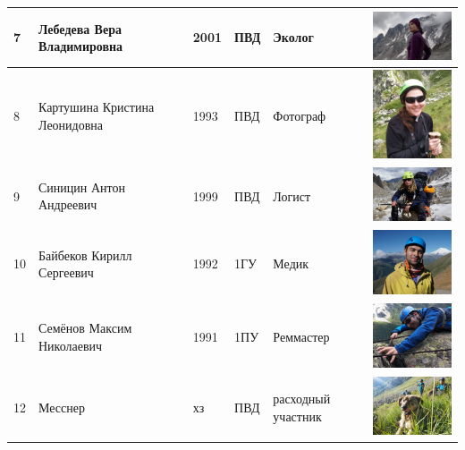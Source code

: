 \documentclass[]{article}
\begin{document}
\begin{center}
\begin{longtable}{|m{0.3cm}|m{3cm}|m{0.7cm}|m{1cm}|m{2cm}|m{4cm}|}
			
			7 &Лебедева Вера Владимировна&2001&ПВД&Эколог&
			\includegraphics[width=4cm]{Vera}\\
			\hline
			8 &Картушина Кристина Леонидовна&1993&ПВД&Фотограф&
			\includegraphics[width=4cm]{Kris}\\
			\hline
			9 &Синицин Антон Андреевич&1999&ПВД&Логист&
			\includegraphics[width=4cm]{Anton_S}\\
			\hline
			10 &Байбеков Кирилл Сергеевич&1992&1ГУ&Медик&
			\includegraphics[width=4cm]{Kiril}\\
			\hline
			11 &Семёнов Максим Николаевич&1991&1ПУ&Реммастер&
			\includegraphics[width=4cm]{Max_S}\\
			\hline
			12 &Месснер&хз&ПВД&расходный участник&
			\includegraphics[width=4cm]{Messner}\\
			\hline			
		\end{longtable}
	\end{center}
\end{document}
